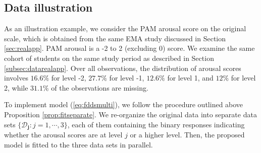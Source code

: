 






\subsection{Data illustration}
\label{subsec:orddataexample}

As an illustration example, we consider the PAM arousal score on the original scale, which is 
obtained from the same EMA study discussed in Section \ref{sec:realapp}. PAM arousal is a -2 to 2 
(excluding 0) score. We examine the same cohort of students on the same study period as described 
in Section \ref{subsec:datarealapp}. Over all observations, the distribution of arousal scores 
involves $16.6\%$ for level -2, $27.7\%$ for level -1, $12.6\%$ for level 1, and $12\%$ for level 2, 
while $31.1\%$ of the observations are missing. 


To implement model (\ref{eq:fddsmulti}), we follow the procedure outlined above 
Proposition \ref{prop:fitseparate}. We re-organize the original data into separate data sets 
$\{\boldsymbol{\mathcal{D}_j}: j=1,\cdots,3\}$, each of them containing the binary responses 
indicating whether the arousal scores are at level $j$ or a higher level. Then, the proposed 
model is fitted to the three data sets in parallel. 


